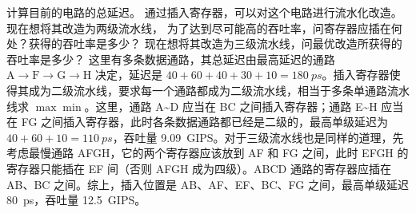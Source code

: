 \begin{problems}
\begin{figure}[H]
        \end{figure}
        \qn 计算目前的电路的总延迟。
        \qn 通过插入寄存器，可以对这个电路进行流水化改造。现在想将其改造为两级流水线， 为了达到尽可能高的吞吐率，问寄存器应插在何处？获得的吞吐率是多少？
        \qn 现在想将其改造为三级流水线，问最优改造所获得的吞吐率是多少？
        \sol 这里有多条数据通路，其总延迟由最高延迟的通路 $\mathrm A \to \mathrm F \to \mathrm G \to \mathrm H$ 决定，延迟是 $40+60+40+30+10 = \SI{180}{ps}$。插入寄存器使得其成为二级流水线，要求每一个通路都成为二级流水线，相当于多条单通路流水线求 $\max \min$。这里，通路 A\textasciitilde D 应当在 BC 之间插入寄存器；通路 E\textasciitilde H 应当在 FG 之间插入寄存器，此时各条数据通路都已经是二级的，最高单级延迟为 $40+60+10 = \SI{110}{ps}$，吞吐量 \SI{9.09}{GIPS}。对于三级流水线也是同样的道理，先考虑最慢通路 AFGH，它的两个寄存器应该放到 AF 和 FG 之间，此时 EFGH 的寄存器只能插在 EF 间（否则 AFGH 成为四级）。ABCD 通路的寄存器应插在 AB、BC 之间。综上，插入位置是 AB、AF、EF、BC、FG 之间，最高单级延迟 \SI{80}{ps}，吞吐量 \SI{12.5}{GIPS}。
    \end{problems}

